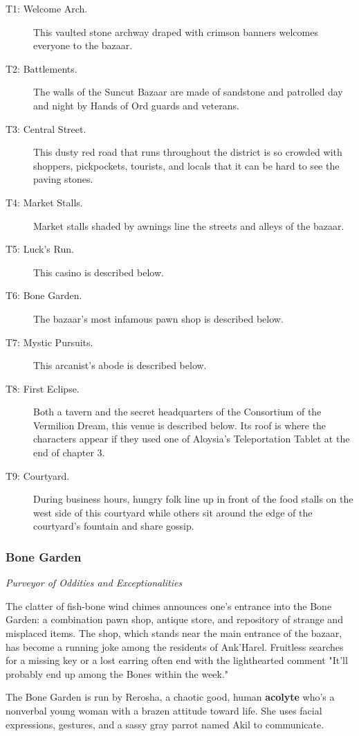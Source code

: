 \documentclass[10pt,a4paper,twoside,fancy,bg=print,twocolumn,openany,nodeprecatedcode]{dndbook}
\begin{document}
\begin{description}
\item[T1: Welcome Arch.]
This vaulted stone archway draped with crimson banners welcomes everyone to the bazaar.
\item[T2: Battlements.]
The walls of the Suncut Bazaar are made of sandstone and patrolled day and night by Hands of Ord guards and veterans.
\item[T3: Central Street.]
This dusty red road that runs throughout the district is so crowded with shoppers, pickpockets, tourists, and locals that it can be hard to see the paving stones.
\item[T4: Market Stalls.]
Market stalls shaded by awnings line the streets and alleys of the bazaar.
\item[T5: Luck's Run.]
This casino is described below.
\item[T6: Bone Garden.]
The bazaar's most infamous pawn shop is described below.
\item[T7: Mystic Pursuits.]
This arcanist's abode is described below.
\item[T8: First Eclipse.]
Both a tavern and the secret headquarters of the Consortium of the Vermilion Dream, this venue is described below. Its roof is where the characters appear if they used one of Aloysia's Teleportation Tablet at the end of chapter 3.
\item[T9: Courtyard.]
During business hours, hungry folk line up in front of the food stalls on the west side of this courtyard while others sit around the edge of the courtyard's fountain and share gossip.
\end{description}

\subsubsection{Bone Garden}
\textit{Purveyor of Oddities and Exceptionalities}

The clatter of fish-bone wind chimes announces one's entrance into the Bone Garden: a combination pawn shop, antique store, and repository of strange and misplaced items. The shop, which stands near the main entrance of the bazaar, has become a running joke among the residents of Ank'Harel. Fruitless searches for a missing key or a lost earring often end with the lighthearted comment "It'll probably end up among the Bones within the week."

The Bone Garden is run by Rerosha, a chaotic good, human \textbf{acolyte} who's a nonverbal young woman with a brazen attitude toward life. She uses facial expressions, gestures, and a sassy gray parrot named Akil to communicate.
\end{document}
